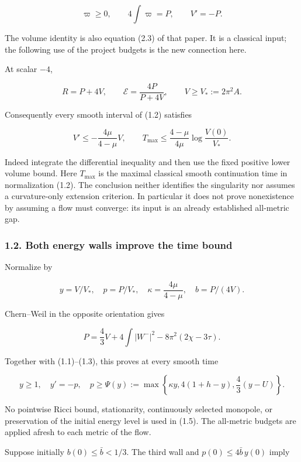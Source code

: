 \documentclass[
  10pt,
]{article}
\begin{document}
\[
 \varpi\ge0,\qquad 4\int\varpi=P,
 \qquad \boxed{V'=-P.}                              \tag{1.3}
\]

The volume identity is also equation (2.3) of that paper. It is a
classical input; the following use of the project budgets is the new
connection here.

At scalar \(-4\),

\[
 R=P+4V,\qquad \mathcal E=\frac{4P}{P+4V},\qquad
 V\ge V_*:=2\pi^2A.
\]

Consequently every smooth interval of (1.2) satisfies

\[
 V'\le-\frac{4\mu}{4-\mu}V,
 \qquad
 \boxed{T_{\max}\le\frac{4-\mu}{4\mu}
                      \log\frac{V(0)}{V_*}.}        \tag{1.4}
\]

Indeed integrate the differential inequality and then use the fixed
positive lower volume bound. Here \(T_{\max}\) is the maximal classical
smooth continuation time in normalization (1.2). The conclusion neither
identifies the singularity nor assumes a curvature-only extension
criterion. In particular it does not prove nonexistence by assuming a
flow must converge: its input is an already established all-metric gap.

\hypertarget{both-energy-walls-improve-the-time-bound}{%
\subsubsection{1.2. Both energy walls improve the time
bound}\label{both-energy-walls-improve-the-time-bound}}

Normalize by

\[
 y=V/V_*,\quad p=P/V_*,\quad
 \kappa=\frac{4\mu}{4-\mu},\quad b=P/(4V).
\]

Chern--Weil in the opposite orientation gives

\[
 P=\frac43V+4\int|W^-|^2-8\pi^2(2\chi-3\tau).
\]

Together with (1.1)--(1.3), this proves at every smooth time

\[
 \boxed{y\ge1,\quad y'=-p,\quad
 p\ge\Psi(y):=\max\left\{\kappa y,
                   4(1+h-y),\frac43(y-U)\right\}.}   \tag{1.5}
\]

No pointwise Ricci bound, stationarity, continuously selected monopole,
or preservation of the initial energy level is used in (1.5). The
all-metric budgets are applied afresh to each metric of the flow.

Suppose initially \(b(0)\le\bar b<1/3\). The third wall and
\(p(0)\le4\bar b\,y(0)\) imply
\end{document}
